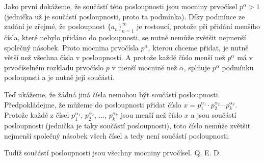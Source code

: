 \documentclass{fkssolpub}
\author{Ondřej Sedláček}
\begin{document}
Jako první dokážeme, že součástí této posloupnosti jsou mocniny
prvočísel $p^{\alpha} > 1$ (jednička už je součástí posloupnosti,
proto ta podmínka). Díky podmínce ze zadání je zřejmé,
že posloupnost $\{a_n\}_{n=1}^{\infty}$ je rostoucí, protože při
přidání menšího čísla, které nebylo přidáno do posloupnosti,
se nutně nemůže zvětšit nejmenší společný násobek. Proto mocnina
prvočísla $p^{\alpha}$, kterou chceme přidat, je nutně větší než všechna
čísla v posloupnosti. A protože každé číslo menší než $p^{\alpha}$ má
v prvočíselném rozkladu prvočíslo $p$ v menší mocnině než $\alpha$,
splňuje $p^{\alpha}$ podmínku posloupnsti a je nutně její součástí.

Teď ukážeme, že žádná jiná čísla nemohou být součástí posloupnosti.
Předpokládejme, že můžeme do posloupnosti přidat číslo $x = p_1^{\alpha_1}
	\cdot p_2^{\alpha_2} \cdots p_k^{\alpha_k}$. Protože každé z čísel
$p_1^{\alpha_1}$, $p_2^{\alpha_2}$, ..., $p_k^{\alpha_k}$ jsou
menší než číslo $x$ a jsou součástí posloupnosti (jednička je
taky součástí posloupnosti), toto číslo nemůže zvětšit nejmenší
společný násobek všech čísel a tedy není součástí posloupnosti.

Tudíž součástí posloupnosti jsou všechny mocniny prvočísel. Q. E. D.
\end{document}
